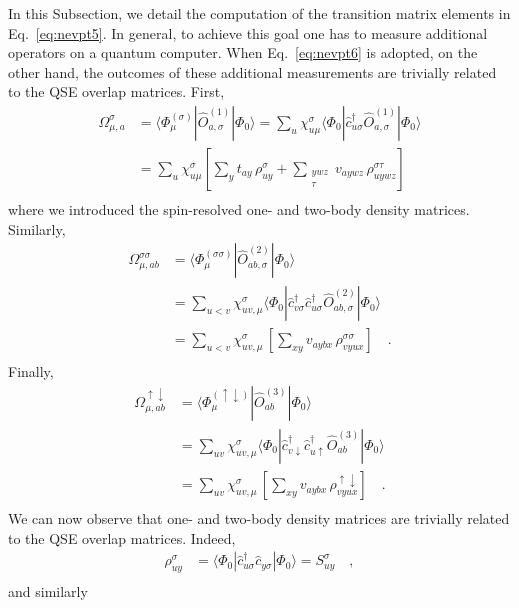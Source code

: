 \documentclass[aps,pra,twocolumn]{revtex4-2}
\newcommand{\crt}[1]{\hat{c}_{#1}^\dagger}
\newcommand{\dst}[1]{\hat{c}_{#1}^{\phantom{\dagger}}}
\begin{document}
In this Subsection, we detail the computation of the transition matrix elements in Eq.~\eqref{eq:nevpt5}. 
In general, to achieve this goal one has to measure additional operators on a quantum computer.
When Eq.~\eqref{eq:nevpt6} is adopted, on the other hand, the outcomes of these additional measurements are trivially related to the QSE overlap matrices.
First,
\begin{equation}
\label{eq:omega_1}
\begin{split}
\Omega^\sigma_{\mu,a} 
&= \langle \Phi^{(\sigma)}_\mu | \hat{O}^{(1)}_{a,\sigma} | \Phi_0 \rangle = \sum_u \chi_{u\mu}^\sigma \langle \Phi_0 | \crt{u\sigma} \hat{O}^{(1)}_{a,\sigma} | \Phi_0 \rangle \\
&= \sum_u \chi_{u\mu}^\sigma \left[ \sum_{y} t_{ay} \, \rho^\sigma_{uy}  + \sum_{ \substack{ywz \\ \tau} } v_{aywz} \, \rho^{\sigma\tau}_{uywz} \right] \\
\end{split}
\end{equation}
where we introduced the spin-resolved one- and two-body density matrices. Similarly,
\begin{equation}
\label{eq:omega_2}
\begin{split}
\Omega^{\sigma\sigma}_{\mu,ab} 
&= \langle \Phi^{(\sigma\sigma)}_\mu | \hat{O}^{(2)}_{ab,\sigma} | \Phi_0 \rangle \\
&= \sum_{u<v} \chi_{uv,\mu}^\sigma \langle \Phi_0 | \crt{v\sigma} \crt{u\sigma} \hat{O}^{(2)}_{ab,\sigma} | \Phi_0 \rangle \\
&= \sum_{u<v} \chi_{uv,\mu}^\sigma \, \left[ \sum_{xy} v_{aybx} \, \rho^{\sigma\sigma}_{vyux} \right] \quad. \\
\end{split}
\end{equation}
Finally,
\begin{equation}
\label{eq:omega_3}
\begin{split}
\Omega^{\uparrow\downarrow}_{\mu,ab} 
&= \langle \Phi^{(\uparrow\downarrow)}_\mu | \hat{O}^{(3)}_{ab} | \Phi_0 \rangle \\
&= \sum_{uv} \chi_{uv,\mu}^\sigma \langle \Phi_0 | \crt{v\downarrow} \crt{u\uparrow} \hat{O}^{(3)}_{ab} | \Phi_0 \rangle \\
&= \sum_{uv} \chi_{uv,\mu}^\sigma \, \left[ \sum_{xy} v_{aybx} \, \rho^{\uparrow\downarrow}_{vyux} \right] \quad .\\
\end{split}
\end{equation}
We can now observe that one- and two-body density matrices are trivially related to the QSE overlap matrices. 
Indeed,
\begin{equation}
\begin{split}
\rho^\sigma_{uy} 
&= \langle \Phi_0 | \crt{u\sigma} \dst{y\sigma} | \Phi_0 \rangle = S^\sigma_{uy} \quad, \\
\end{split}
\end{equation}
and similarly
\end{document}

